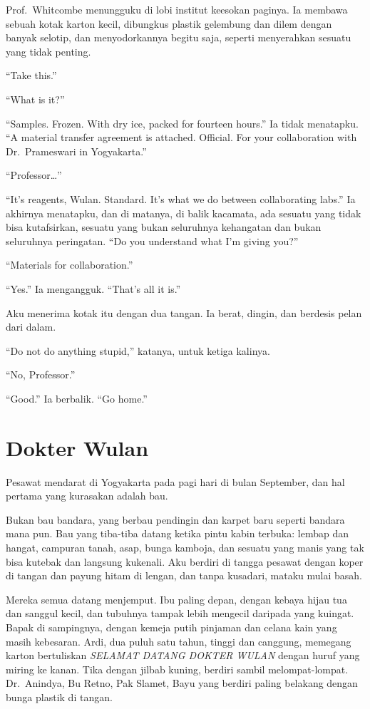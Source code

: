 \documentclass[11pt,twoside,openany]{book}
\begin{document}
Prof.~Whitcombe menungguku di lobi institut keesokan paginya. Ia membawa sebuah kotak karton kecil, dibungkus plastik gelembung dan dilem dengan banyak selotip, dan menyodorkannya begitu saja, seperti menyerahkan sesuatu yang tidak penting.

``Take this.''

``What is it?''

``Samples. Frozen. With dry ice, packed for fourteen hours.'' Ia tidak menatapku. ``A material transfer agreement is attached. Official. For your collaboration with Dr.~Prameswari in Yogyakarta.''

``Professor\ldots{}''

``It's reagents, Wulan. Standard. It's what we do between collaborating labs.'' Ia akhirnya menatapku, dan di matanya, di balik kacamata, ada sesuatu yang tidak bisa kutafsirkan, sesuatu yang bukan seluruhnya kehangatan dan bukan seluruhnya peringatan. ``Do you understand what I'm giving you?''

``Materials for collaboration.''

``Yes.'' Ia mengangguk. ``That's all it is.''

Aku menerima kotak itu dengan dua tangan. Ia berat, dingin, dan berdesis pelan dari dalam.

``Do not do anything stupid,'' katanya, untuk ketiga kalinya.

``No, Professor.''

``Good.'' Ia berbalik. ``Go home.''

\chapter{Dokter Wulan}
Pesawat mendarat di Yogyakarta pada pagi hari di bulan September, dan hal pertama yang kurasakan adalah bau.

Bukan bau bandara, yang berbau pendingin dan karpet baru seperti bandara mana pun. Bau yang tiba-tiba datang ketika pintu kabin terbuka: lembap dan hangat, campuran tanah, asap, bunga kamboja, dan sesuatu yang manis yang tak bisa kutebak dan langsung kukenali. Aku berdiri di tangga pesawat dengan koper di tangan dan payung hitam di lengan, dan tanpa kusadari, mataku mulai basah.

Mereka semua datang menjemput. Ibu paling depan, dengan kebaya hijau tua dan sanggul kecil, dan tubuhnya tampak lebih mengecil daripada yang kuingat. Bapak di sampingnya, dengan kemeja putih pinjaman dan celana kain yang masih kebesaran. Ardi, dua puluh satu tahun, tinggi dan canggung, memegang karton bertuliskan \emph{SELAMAT DATANG DOKTER WULAN} dengan huruf yang miring ke kanan. Tika dengan jilbab kuning, berdiri sambil melompat-lompat. Dr.~Anindya, Bu Retno, Pak Slamet, Bayu yang berdiri paling belakang dengan bunga plastik di tangan.
\end{document}
